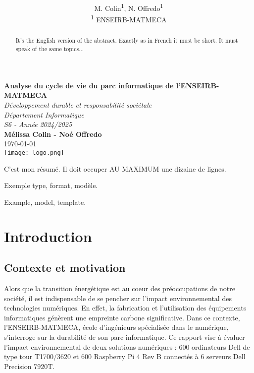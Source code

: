 \documentclass[12pt,a4paper]{paper}
\title{\textbf{\Title}}
\author{M. Colin\textsuperscript{1}, N. Offredo\textsuperscript{1}\\[6pt]
\textsuperscript{1} ENSEIRB-MATMECA\\
}
\newcommand{\Title}{Analyse du cycle de vie du parc informatique de l’ENSEIRB-MATMECA}
\newcommand{\Course}{Développement durable et responsabilité sociétale
\\ Département Informatique
\\ S6 - Année 2024/2025}
\newcommand{\Author}{Mélissa Colin - Noé Offredo}
\newcommand{\Date}{\today}
\begin{document}
\begin{titlepage}
    \centering
    \vspace*{3cm}
    {\Huge \textbf{\Title}}\\[1.5cm]
    {\Large \textit{\Course}}\\[2cm]
    \textbf{\Author}\\[1cm]
    \Date\\
    \vfill
    \texttt{[image: logo.png]}
    \vspace*{1cm}
\end{titlepage}

\maketitle

\begin{resume}
C'est mon résumé. Il doit occuper AU MAXIMUM une dizaine de lignes.
\end{resume}

\begin{motscles}
Exemple type, format, modèle.
\end{motscles}

\begin{abstract}
It's the English version of the abstract. Exactly as in French it must be short. It must speak of the same topics...  
\end{abstract}

\begin{keywords}
Example, model, template.
\end{keywords}


\section{Introduction}
\subsection{Contexte et motivation}
Alors que la transition énergétique est au coeur des préoccupations de notre société, il est indispensable de se pencher sur l'impact environnemental des technologies numériques. En effet, la fabrication et l'utilisation des équipements informatiques génèrent une empreinte carbone significative. Dans ce contexte, l'ENSEIRB-MATMECA, école d'ingénieurs spécialisée dans le numérique, s'interroge sur la durabilité de son parc informatique. Ce rapport vise à évaluer l'impact environnemental de deux solutions numériques : 600 ordinateurs Dell de type tour T1700/3620 et 600 Raspberry Pi 4 Rev B connectés à 6 serveurs Dell Precision 7920T.
\end{document}
